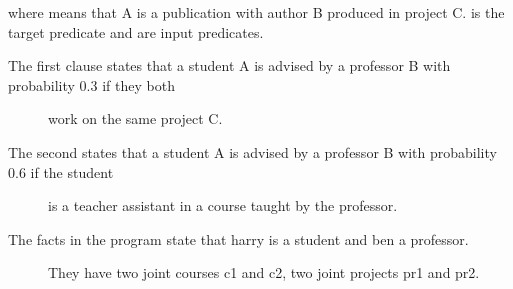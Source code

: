 \documentclass[letterpaper,10pt,english]{sphinxmanual}
\begin{document}
\begin{sphinxVerbatim}[commandchars=\\\{\}]
 
 

 
 
 
 
 
\end{sphinxVerbatim}

\sphinxAtStartPar
where  means that A is a publication with author B produced in project C.
 is the target predicate and 
are input predicates.
\begin{description}
\item[{The first clause states that a student A is advised by a professor B with probability 0.3 if they both}] \leavevmode
\sphinxAtStartPar
work on the same project C.

\item[{The second states that a student A is advised by a professor B with probability 0.6 if the student}] \leavevmode
\sphinxAtStartPar
is a teacher assistant in a course taught by the professor.

\item[{The facts in the program state that harry is a student and ben a professor.}] \leavevmode
\sphinxAtStartPar
They have two joint courses c1 and c2, two joint projects pr1 and pr2.

\end{description}
\end{document}
